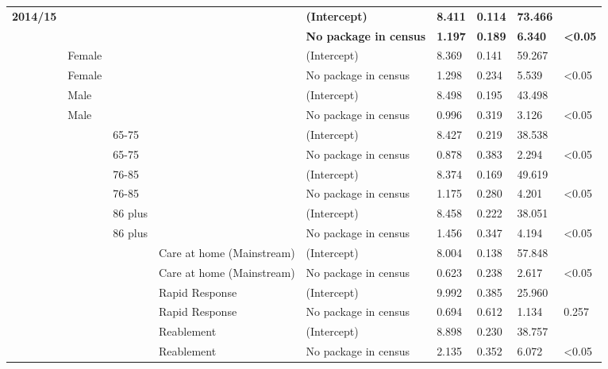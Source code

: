 \documentclass[]{article}
\begin{document}
\begin{landscape}
\begin{longtable}[c]{@{}lllllllll@{}}
\textbf{2014/15} & \textbf{} & \textbf{} & \textbf{} & \textbf{(Intercept)} & \textbf{8.411} & \textbf{0.114} & \textbf{73.466} & \textbf{} \\
\textbf{} & \textbf{} & \textbf{} & \textbf{} & \textbf{No package in census} & \textbf{1.197} & \textbf{0.189} & \textbf{6.340} & \textbf{\textless{}0.05} \\
 & Female &  &  & (Intercept) & 8.369 & 0.141 & 59.267 &  \\
 & Female &  &  & No package in census & 1.298 & 0.234 & 5.539 & \textless{}0.05 \\
 & Male &  &  & (Intercept) & 8.498 & 0.195 & 43.498 &  \\
 & Male &  &  & No package in census & 0.996 & 0.319 & 3.126 & \textless{}0.05 \\
 &  & 65-75 &  & (Intercept) & 8.427 & 0.219 & 38.538 &  \\
 &  & 65-75 &  & No package in census & 0.878 & 0.383 & 2.294 & \textless{}0.05 \\
 &  & 76-85 &  & (Intercept) & 8.374 & 0.169 & 49.619 &  \\
 &  & 76-85 &  & No package in census & 1.175 & 0.280 & 4.201 & \textless{}0.05 \\
 &  & 86 plus &  & (Intercept) & 8.458 & 0.222 & 38.051 &  \\
 &  & 86 plus &  & No package in census & 1.456 & 0.347 & 4.194 & \textless{}0.05 \\
 &  &  & Care at home (Mainstream) & (Intercept) & 8.004 & 0.138 & 57.848 &  \\
 &  &  & Care at home (Mainstream) & No package in census & 0.623 & 0.238 & 2.617 & \textless{}0.05 \\
 &  &  & Rapid Response & (Intercept) & 9.992 & 0.385 & 25.960 &  \\
 &  &  & Rapid Response & No package in census & 0.694 & 0.612 & 1.134 & 0.257 \\
 &  &  & Reablement & (Intercept) & 8.898 & 0.230 & 38.757 &  \\
 &  &  & Reablement & No package in census & 2.135 & 0.352 & 6.072 & \textless{}0.05 \\* \bottomrule
\end{longtable}
\end{landscape}
\end{document}
